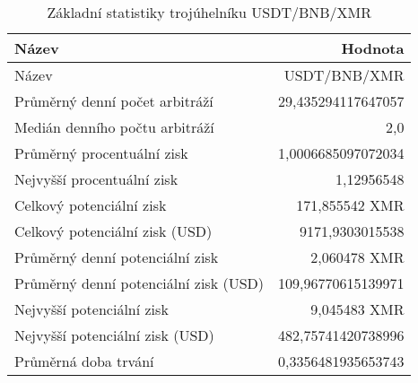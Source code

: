 \begin{table}\centering
\caption{Základní statistiky trojúhelníku USDT/BNB/XMR}
\label{USDTBNBXMR_stats}
\begin{tabular}{|| l | r ||}
\hline Název & Hodnota \\ 
\hline\hline Název & USDT/BNB/XMR \\ 
\hline Průměrný denní počet arbitráží & 29,435294117647057 \\ 
\hline Medián denního počtu arbitráží & 2,0 \\ 
\hline Průměrný procentuální zisk & 1,0006685097072034 \\ 
\hline Nejvyšší procentuální zisk & 1,12956548 \\ 
\hline Celkový potenciální zisk & 171,855542 XMR \\ 
\hline Celkový potenciální zisk (USD) & 9171,9303015538 \\ 
\hline Průměrný denní potenciální zisk & 2,060478 XMR \\ 
\hline Průměrný denní potenciální zisk (USD) & 109,96770615139971 \\ 
\hline Nejvyšší potenciální zisk & 9,045483 XMR \\ 
\hline Nejvyšší potenciální zisk (USD) & 482,75741420738996 \\ 
\hline Průměrná doba trvání & 0,3356481935653743 \\ 
\hline
\end{tabular}
\end{table}